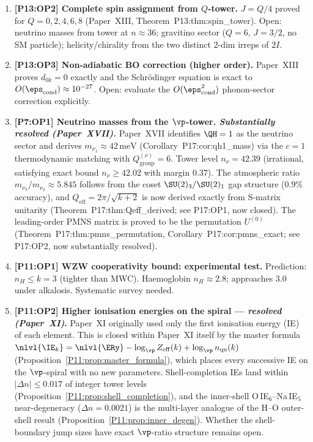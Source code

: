 \begin{enumerate}[label=,leftmargin=*]
\item \textbf{[P13:OP2] Complete spin assignment from $Q$-tower.}
$J=Q/4$ proved for $Q=0,2,4,6,8$ (Paper~XIII, Theorem~P13:thm:spin\_tower).
Open: neutrino masses from tower at $n\approx36$; gravitino sector ($Q=6$,
$J=3/2$, no SM particle); helicity/chirality from the two distinct 2-dim
irreps of $2I$.

\item \textbf{[P13:OP3] Non-adiabatic BO correction (higher order).}
Paper~XIII proves $d_{0k}=0$ exactly and the Schr\"odinger equation is
exact to $O(\eps_\mathrm{cond})\approx10^{-27}$. Open: evaluate the
$O(\eps_\mathrm{cond}^2)$ phonon-sector correction explicitly.

\item \textbf{[P7:OP1] Neutrino masses from the $\vp$-tower. \emph{Substantially resolved (Paper~XVII).}}
Paper~XVII identifies $\QH=1$ as the neutrino sector and derives
$m_{\nu_1}\approx42\,\mathrm{meV}$ (Corollary~P17:cor:qh1\_mass) via the
$c=1$ thermodynamic matching with $Q_{\mathrm{group}}^{(\nu)}=6$.
Tower level $n_\nu=42.39$ (irrational, satisfying exact bound $n_\nu\geq42.02$
with margin $0.37$). The atmospheric ratio $m_{\nu_3}/m_{\nu_2}\approx5.845$
follows from the coset $\SU(2)_3/\SU(2)_1$ gap structure ($0.9\%$ accuracy),
and $Q_{\mathrm{eff}}=2\pi/\sqrt{k+2}$ is now derived exactly from
S-matrix unitarity (Theorem~P17:thm:Qeff\_derived; see P17:OP1, now closed).
The leading-order PMNS matrix is proved to be the permutation
$U^{(0)}$ (Theorem~P17:thm:pmns\_permutation, Corollary~P17:cor:pmns\_exact;
see P17:OP2, now substantially resolved).

\item \textbf{[P11:OP1] WZW cooperativity bound: experimental test.}
Prediction: $n_H\le k=3$ (tighter than MWC). Haemoglobin $n_H\approx2.8$;
approaches 3.0 under alkalosis. Systematic survey needed.

\item \textbf{[P11:OP2] Higher ionisation energies on the spiral --- \emph{resolved (Paper~XI)}.}
Paper~XI originally used only the first ionisation energy (IE) of each
element. This is closed within Paper~XI itself by the master formula
$\nlvl{\IE_k}=\nlvl{\ERy}-\log_\vp Z_{\rm eff}(k)+\log_\vp n_{\rm qn}(k)$
(Proposition~\ref{P11:prop:master_formula}), which places every
successive IE on the $\vp$-spiral with no new parameters. Shell-completion
IEs land within $|\Delta n|\le0.017$ of integer tower levels
(Proposition~\ref{P11:prop:shell_completion}), and the inner-shell
O\,IE$_6$--Na\,IE$_5$ near-degeneracy ($\Delta n=0.0021$) is the
multi-layer analogue of the H--O outer-shell result
(Proposition~\ref{P11:prop:inner_degen}). Whether the shell-boundary
jump sizes have exact $\vp$-ratio structure remains open.


\end{enumerate}
